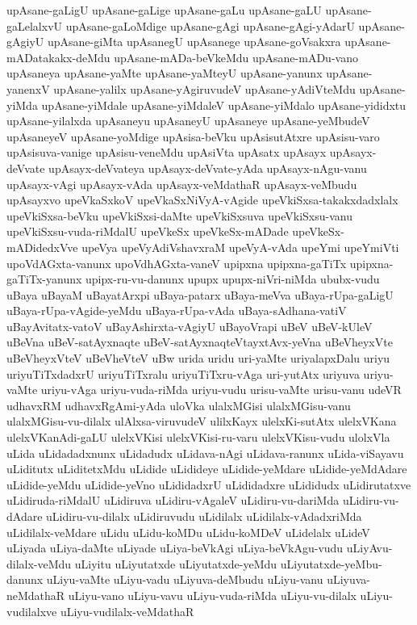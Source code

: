 {upAsane-gaLigU
upAsane-gaLige
upAsane-gaLu
upAsane-gaLU
upAsane-gaLelalxvU
upAsane-gaLoMdige
upAsane-gAgi
upAsane-gAgi-yAdarU
upAsane-gAgiyU
upAsane-giMta
upAsanegU
upAsanege
upAsane-goVsakxra
upAsane-mADatakakx-deMdu
upAsane-mADa-beVkeMdu
upAsane-mADu-vano
upAsaneya
upAsane-yaMte
upAsane-yaMteyU
upAsane-yanunx
upAsane-yanenxV
upAsane-yalilx
upAsane-yAgiruvudeV
upAsane-yAdiVteMdu
upAsane-yiMda
upAsane-yiMdale
upAsane-yiMdaleV
upAsane-yiMdalo
upAsane-yididxtu
upAsane-yilalxda
upAsaneyu
upAsaneyU
upAsaneye
upAsane-yeMbudeV
upAsaneyeV
upAsane-yoMdige
upAsisa-beVku
upAsisutAtxre
upAsisu-varo
upAsisuva-vanige
upAsisu-veneMdu
upAsiVta
upAsatx
upAsayx
upAsayx-deVvate
upAsayx-deVvateya
upAsayx-deVvate-yAda
upAsayx-nAgu-vanu
upAsayx-vAgi
upAsayx-vAda
upAsayx-veMdathaR
upAsayx-veMbudu
upAsayxvo
upeVkaSxkoV
upeVkaSxNiVyA-vAgide
upeVkiSxsa-takakxdadxlalx
upeVkiSxsa-beVku
upeVkiSxsi-daMte
upeVkiSxsuva
upeVkiSxsu-vanu
upeVkiSxsu-vuda-riMdalU
upeVkeSx
upeVkeSx-mADade
upeVkeSx-mADidedxVve
upeVya
upeVyAdiVshavxraM
upeVyA-vAda
upeYmi
upeYmiVti
upoVdAGxta-vanunx
upoVdhAGxta-vaneV
upipxna
upipxna-gaTiTx
upipxna-gaTiTx-yanunx
upipx-ru-vu-danunx
upupx
upupx-niVri-niMda
ububx-vudu
uBaya
uBayaM
uBayatArxpi
uBaya-patarx
uBaya-meVva
uBaya-rUpa-gaLigU
uBaya-rUpa-vAgide-yeMdu
uBaya-rUpa-vAda
uBaya-sAdhana-vatiV
uBayAvitatx-vatoV
uBayAshirxta-vAgiyU
uBayoVrapi
uBeV
uBeV-kUleV
uBeVna
uBeV-satAyxnaqte
uBeV-satAyxnaqteVtayxtAvx-yeVna
uBeVheyxVte
uBeVheyxVteV
uBeVheVteV
uBw
urida
uridu
uri-yaMte
uriyalapxDalu
uriyu
uriyuTiTxdadxrU
uriyuTiTxralu
uriyuTiTxru-vAga
uri-yutAtx
uriyuva
uriyu-vaMte
uriyu-vAga
uriyu-vuda-riMda
uriyu-vudu
urisu-vaMte
urisu-vanu
udeVR
udhavxRM
udhavxRgAmi-yAda
uloVka
ulalxMGisi
ulalxMGisu-vanu
ulalxMGisu-vu-dilalx
ulAlxsa-viruvudeV
ulilxKayx
ulelxKi-sutAtx
ulelxVKana
ulelxVKanAdi-gaLU
ulelxVKisi
ulelxVKisi-ru-varu
ulelxVKisu-vudu
ulolxVla
uLida
uLidadadxnunx
uLidadudx
uLidava-nAgi
uLidava-ranunx
uLida-viSayavu
uLiditutx
uLiditetxMdu
uLidide
uLidideye
uLidide-yeMdare
uLidide-yeMdAdare
uLidide-yeMdu
uLidide-yeVno
uLididadxrU
uLididadxre
uLididudx
uLidirutatxve
uLidiruda-riMdalU
uLidiruva
uLidiru-vAgaleV
uLidiru-vu-dariMda
uLidiru-vu-dAdare
uLidiru-vu-dilalx
uLidiruvudu
uLidilalx
uLidilalx-vAdadxriMda
uLidilalx-veMdare
uLidu
uLidu-koMDu
uLidu-koMDeV
uLidelalx
uLideV
uLiyada
uLiya-daMte
uLiyade
uLiya-beVkAgi
uLiya-beVkAgu-vudu
uLiyAvu-dilalx-veMdu
uLiyitu
uLiyutatxde
uLiyutatxde-yeMdu
uLiyutatxde-yeMbu-danunx
uLiyu-vaMte
uLiyu-vadu
uLiyuva-deMbudu
uLiyu-vanu
uLiyuva-neMdathaR
uLiyu-vano
uLiyu-vavu
uLiyu-vuda-riMda
uLiyu-vu-dilalx
uLiyu-vudilalxve
uLiyu-vudilalx-veMdathaR
}
